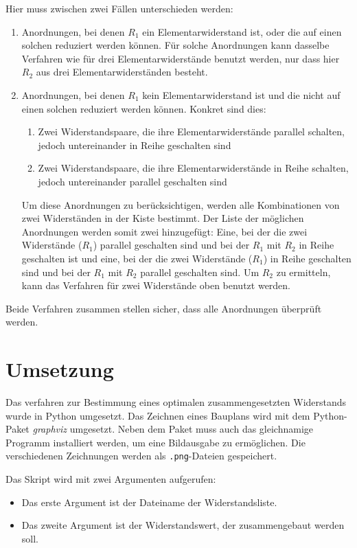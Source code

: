 \documentclass[a4paper,10pt,ngerman]{scrartcl}
\begin{document}
\begin{enumerate}
  Hier muss zwischen zwei Fällen unterschieden werden:
  \begin{enumerate}
    \item Anordnungen, bei denen $R_1$ ein Elementarwiderstand ist, oder die auf einen solchen reduziert werden können. Für solche Anordnungen kann dasselbe Verfahren wie für drei Elementarwiderstände benutzt werden, nur dass hier $R_2$ aus drei Elementarwiderständen besteht.
    \item Anordnungen, bei denen $R_1$ kein Elementarwiderstand ist und die nicht auf einen solchen reduziert werden können. Konkret sind dies:
    \begin{enumerate}
      \item Zwei Widerstandspaare, die ihre Elementarwiderstände parallel schalten, jedoch untereinander in Reihe geschalten sind
      \item Zwei Widerstandspaare, die ihre Elementarwiderstände in Reihe schalten, jedoch untereinander parallel geschalten sind
    \end{enumerate}
    Um diese Anordnungen zu berücksichtigen, werden alle Kombinationen von zwei Widerständen in der Kiste bestimmt. Der Liste der möglichen Anordnungen werden somit zwei hinzugefügt: Eine, bei der die zwei Widerstände ($R_1$) parallel geschalten sind und bei der $R_1$ mit $R_2$ in Reihe geschalten ist und eine, bei der die zwei Widerstände ($R_1$) in Reihe geschalten sind und bei der $R_1$ mit $R_2$ parallel geschalten sind. Um $R_2$ zu ermitteln, kann das Verfahren für zwei Widerstände oben benutzt werden.
  \end{enumerate}
  Beide Verfahren zusammen stellen sicher, dass alle Anordnungen überprüft werden.
\end{enumerate}


\section{Umsetzung}
Das verfahren zur Bestimmung eines optimalen zusammengesetzten Widerstands wurde in Python umgesetzt. Das Zeichnen eines Bauplans wird mit dem Python-Paket \textit{graphviz} umgesetzt. Neben dem Paket muss auch das gleichnamige Programm installiert werden, um eine Bildausgabe zu ermöglichen. Die verschiedenen Zeichnungen werden als \texttt{.png}-Dateien gespeichert.

Das Skript wird mit zwei Argumenten aufgerufen:
\begin{itemize}
  \item Das erste Argument ist der Dateiname der Widerstandsliste.
  \item Das zweite Argument ist der Widerstandswert, der zusammengebaut werden soll.
\end{itemize}
\end{document}
